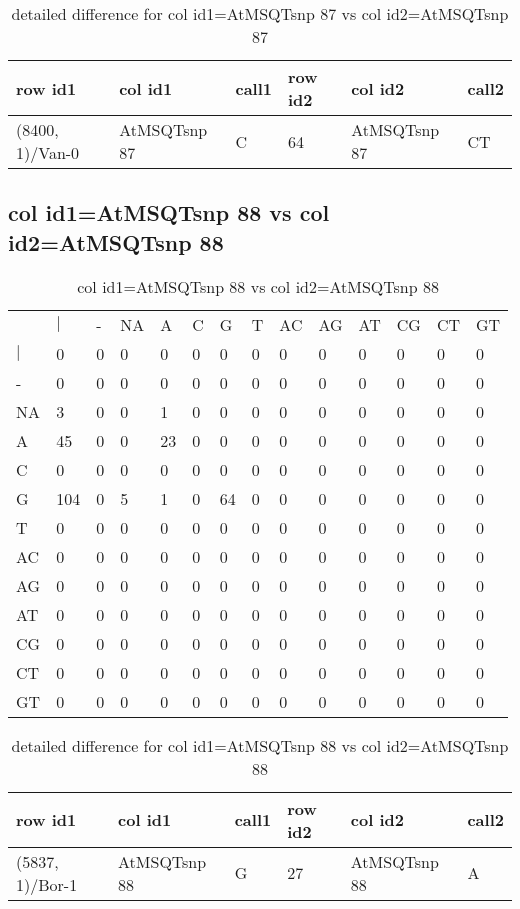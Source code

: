 \begin{center}
\begin{longtable}{|l|l|l|l|l|l|}
\caption{detailed difference for col id1=AtMSQTsnp 87 vs col id2=AtMSQTsnp 87} \label{table_dm779}\\
\hline
row id1&col id1&call1&row id2&col id2&call2\\
\hline
(8400, 1)/Van-0&AtMSQTsnp 87&C&64&AtMSQTsnp 87&CT\\
\hline
\end{longtable}
\end{center}

\subsection{col id1=AtMSQTsnp 88 vs col id2=AtMSQTsnp 88}
\begin{center}
\begin{longtable}{|l|l|l|l|l|l|l|l|l|l|l|l|l|l|}
\caption{col id1=AtMSQTsnp 88 vs col id2=AtMSQTsnp 88} \label{table_dm780}\\
\hline
\\
\hline
&$|$&-&NA&A&C&G&T&AC&AG&AT&CG&CT&GT\\
$|$&0&0&0&0&0&0&0&0&0&0&0&0&0\\
-&0&0&0&0&0&0&0&0&0&0&0&0&0\\
NA&3&0&0&1&0&0&0&0&0&0&0&0&0\\
A&45&0&0&23&0&0&0&0&0&0&0&0&0\\
C&0&0&0&0&0&0&0&0&0&0&0&0&0\\
G&104&0&5&1&0&64&0&0&0&0&0&0&0\\
T&0&0&0&0&0&0&0&0&0&0&0&0&0\\
AC&0&0&0&0&0&0&0&0&0&0&0&0&0\\
AG&0&0&0&0&0&0&0&0&0&0&0&0&0\\
AT&0&0&0&0&0&0&0&0&0&0&0&0&0\\
CG&0&0&0&0&0&0&0&0&0&0&0&0&0\\
CT&0&0&0&0&0&0&0&0&0&0&0&0&0\\
GT&0&0&0&0&0&0&0&0&0&0&0&0&0\\
\hline
\end{longtable}
\end{center}

\begin{center}
\begin{longtable}{|l|l|l|l|l|l|}
\caption{detailed difference for col id1=AtMSQTsnp 88 vs col id2=AtMSQTsnp 88} \label{table_dm781}\\
\hline
row id1&col id1&call1&row id2&col id2&call2\\
\hline
(5837, 1)/Bor-1&AtMSQTsnp 88&G&27&AtMSQTsnp 88&A\\
\hline
\end{longtable}
\end{center}

